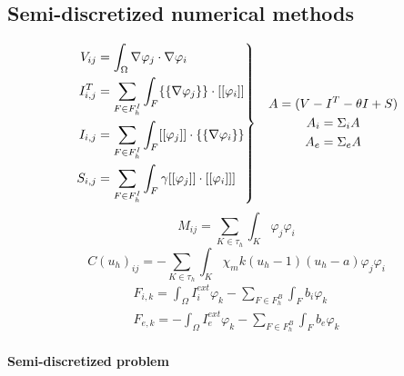 \documentclass[a4paper]{article}
\newenvironment{rcases}
{\left.\begin{aligned}}
	{\end{aligned}\right\rbrace}
\begin{document}
\vspace{5mm}

\subsection{Semi-discretized numerical methods}

\vspace{5mm}
\begin{equation}
\begin{rcases}
V_{ij} &= \int_{\Omega}\nabla\varphi_j \cdot \nabla \varphi_i 
\\ I_{i,j}^T &= \sum_{F \in F_h^I} \int_{F} \{\{\nabla\varphi_j\}\} \cdot [[\varphi_i]] 
\\ I_{i,j} &= \sum_{F \in F_h^I} \int_{F} [[\varphi_j]] \cdot \{\{\nabla \varphi_i\}\}
\\S_{i,j} &= \sum_{F \in F_h^I} \int_{F} \gamma [[\varphi_j]] \cdot [[\varphi_i]]]
\end{rcases}
\begin{gathered}
\quad A = (V -I^T - \theta I + S)\\
\quad A_i = \Sigma_iA \\
\quad A_e = \Sigma_eA
\end{gathered}
\end{equation}
\begin{equation}
M_{ij} = \sum_{K \in \tau_h}\int_K
\varphi_j\varphi_i
\end{equation}
\begin{equation}
C(u_h)_{ij} = - \sum_{K \in \tau_h} \int_K \chi_m k(u_h-1)(u_h-a)\varphi_j\varphi_i
\end{equation}
\begin{equation}
\begin{gathered}
F_{i,k} = \int_{\Omega} I_i^{ext}\varphi_k - \sum_{F \in F_h^B} \int_F b_i\varphi_k
\\
F_{e,k} = - \int_{\Omega} I_e^{ext}\varphi_k - \sum_{F \in F_h^B} \int_F b_e\varphi_k
\end{gathered}
\end{equation}


	\vspace{3mm}
\paragraph{Semi-discretized problem} 
\end{document}
